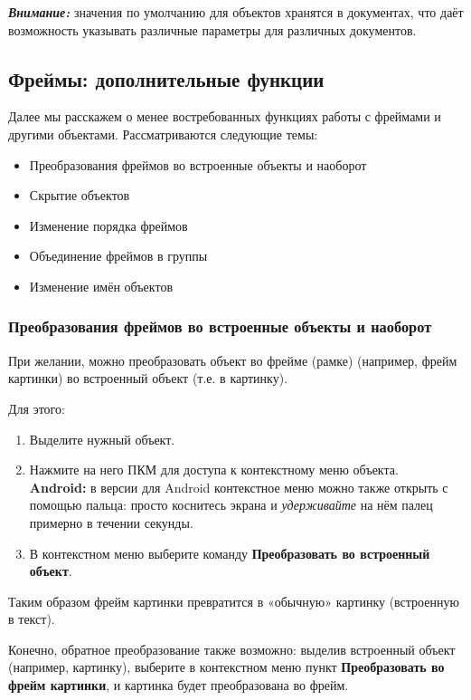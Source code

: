 \documentclass[a4paper,10pt]{article}
\begin{document}
\begin{mdframed}[backgroundcolor=blue!10]
\textbf{\textit{Внимание:}} значения по умолчанию для объектов хранятся в документах, что даёт возможность указывать различные параметры для различных документов.
\end{mdframed}

\subsection{Фреймы: дополнительные функции}
Далее мы расскажем о менее востребованных функциях работы с фреймами и другими объектами. Рассматриваются следующие темы:

\begin{itemize}
 \item Преобразования фреймов во встроенные объекты и наоборот
 \item Скрытие объектов
 \item Изменение порядка фреймов
 \item Объединение фреймов в группы
 \item Изменение имён объектов
\end{itemize}

\subsubsection{Преобразования фреймов во встроенные объекты и наоборот}
При желании, можно преобразовать объект во фрейме (рамке) (например, фрейм картинки) во встроенный объект (т.е. в картинку).

Для этого:

\begin{enumerate}
 \item Выделите нужный объект.
 \item Нажмите на него ПКМ для доступа к контекстному меню объекта.\\
 \textbf{Android:} в версии для Android контекстное меню можно также открыть с помощью пальца: просто коснитесь экрана и \textit{удерживайте} на нём палец примерно в течении секунды.
 \item В контекстном меню выберите команду \textbf{Преобразовать во встроенный объект}.
\end{enumerate}

Таким образом фрейм картинки превратится в «обычную» картинку (встроенную в текст).

Конечно, обратное преобразование также возможно: выделив встроенный объект (например, картинку), выберите в контекстном меню пункт \textbf{Преобразовать во фрейм картинки}, и картинка будет преобразована во фрейм.
\end{document}
